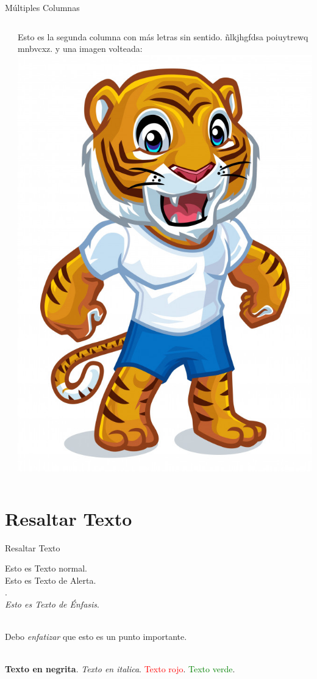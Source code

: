 \documentclass{IFES-beamer}
\begin{document}
\begin{frame}{Múltiples Columnas}
\begin{columns}
\begin{column}{0.5\textwidth}
\end{column}
\begin{column}{0.5\textwidth}
Esto es la segunda columna con más letras sin sentido. ñlkjhgfdsa poiuytrewq mnbvcxz. y una imagen volteada: \includegraphics[scale=0.25, angle=180]{Resources/Tigre.jpg}
\end{column}
\end{columns}

\end{frame}

\section{Resaltar Texto}
\begin{frame}{Resaltar Texto}

Esto es Texto normal. \\
\alert{Esto es Texto de Alerta}. \\
. \\
\emph{Esto es Texto de Énfasis}. \\\

Debo \emph{enfatizar} que esto es un punto \alert{importante}. \\\

\textbf{Texto en negrita}.
\textit{Texto en italica}.
\textcolor{red}{Texto rojo}.
\textcolor{green}{Texto verde}.

\end{frame}
\end{document}
